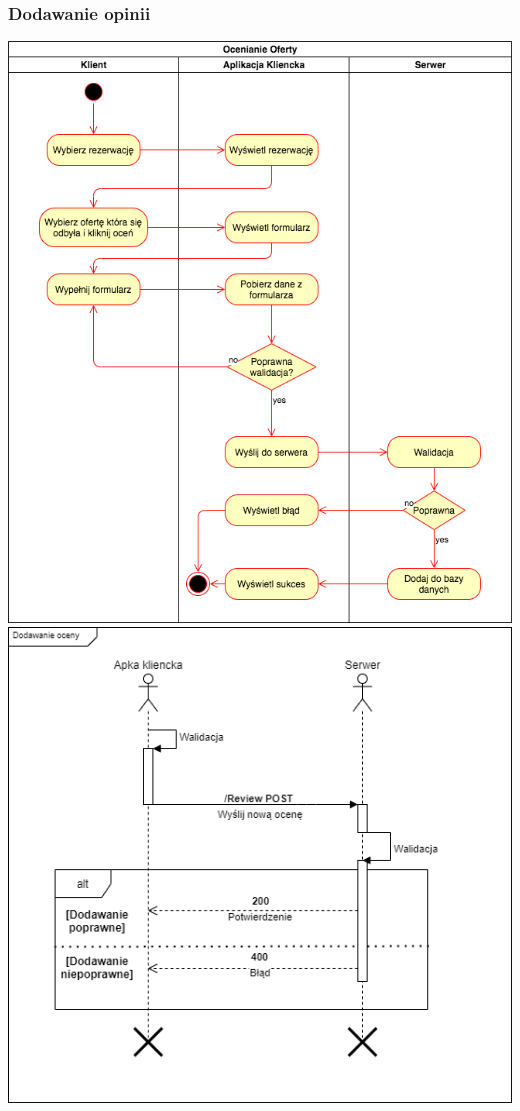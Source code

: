 \documentclass{article}
\begin{document}
\subsubsection{Dodawanie opinii}
\begin{center}
    \includegraphics[width=\linewidth]{Aktywnosc/IO_Aktywności-Dodawanie oceny.png}\newpage
    \includegraphics[width=\linewidth]{Sekwencje/Opinion_Add.png}
\end{center}
\end{document}
